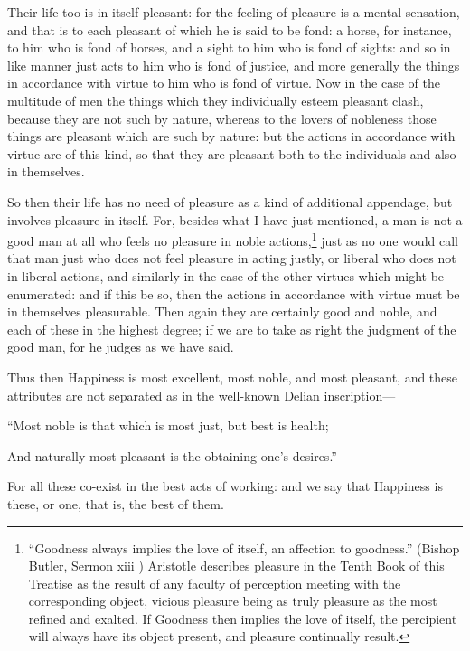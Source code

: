 Their life too is in itself pleasant: for the feeling of pleasure is a mental
sensation, and that is to each pleasant of which he is said to be fond: a
horse, for instance, to him who is fond of horses, and a sight to him who is
fond of sights: and so in like manner just acts to him who is fond of justice,
and more generally the things in accordance with virtue to him who is fond of
virtue. Now in the case of the multitude of men the things which they
individually esteem pleasant clash, because they are not such by nature,
whereas to the lovers of nobleness those things are pleasant which are such by
nature: but the actions in accordance with virtue are of this kind, so that
they are pleasant both to the individuals and also in themselves.

So then their life has no need of pleasure as a kind of additional appendage,
but involves pleasure in itself. For, besides what I have just mentioned, a man
is not a good man at all who feels no pleasure in noble actions,\footnote{“Goodness always implies the love of itself, an affection to
goodness.” (Bishop Butler, Sermon xiii ) Aristotle describes pleasure in
the Tenth Book of this Treatise as the result of any faculty of perception
meeting with the corresponding object, vicious pleasure being as truly pleasure
as the most refined and exalted. If Goodness then implies the love of itself,
the percipient will always have its object present, and pleasure continually
result.}
just as no one would call that man just who does not feel pleasure in acting
justly, or liberal who does not in liberal actions, and similarly in the case
of the other virtues which might be enumerated: and if this be so, then the
actions in accordance with virtue must be in themselves pleasurable. Then again
they are certainly good and noble, and each of these in the highest degree; if
we are to take as right the judgment of the good man, for he judges as we have
said.

Thus then Happiness is most excellent, most noble, and most pleasant, and these
attributes are not separated as in the well-known Delian inscription—

“Most noble is that which is most just, but best is health;

And naturally most pleasant is the obtaining one’s desires.”

For all these co-exist in the best acts of working: and we say that Happiness
is these, or one, that is, the best of them.

